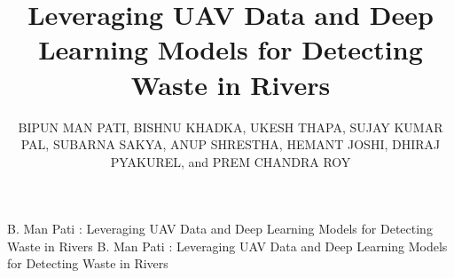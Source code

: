 \documentclass{ieeeaccess}
\begin{document}
\doi{-}

\title{Leveraging UAV Data and Deep Learning Models for Detecting Waste in Rivers}
\author{\uppercase{Bipun Man Pati},
\uppercase{Bishnu Khadka}, 
\uppercase{Ukesh Thapa},
\uppercase{Sujay Kumar Pal},
\uppercase{Subarna Sakya},
\uppercase{Anup Shrestha},
\uppercase{Hemant Joshi},
\uppercase{Dhiraj Pyakurel},
and \uppercase{Prem Chandra Roy}}

\address[1]{AI Research Center, Advanced College of Engineering and Management, Tribhuvan University, Kathmandu, Nepal}
\address[2]{Department of Electronics and Computer Engineering, Pulchowk Campus, Tribhuvan University, Kathmandu, Nepal}
\address[3]{Department of Electronics and Computer Engineering, Thapathali Campus, Tribhuvan University, Kathmandu, Nepal}
\address[4]{Department of Computer Engineering, Universal Engineering and Science College, Pokhara University, Kathmandu, Nepal}
\address[5]{Department of Electronics and Computer Engineering, Advanced College of Engineering and Management, Tribhuvan University, Kathmandu, Nepal}

\markboth
{B. Man Pati \headeretal: Leveraging UAV Data and Deep Learning Models for Detecting Waste in Rivers}
{B. Man Pati \headeretal: Leveraging UAV Data and Deep Learning Models for Detecting Waste in Rivers}

\end{document}
